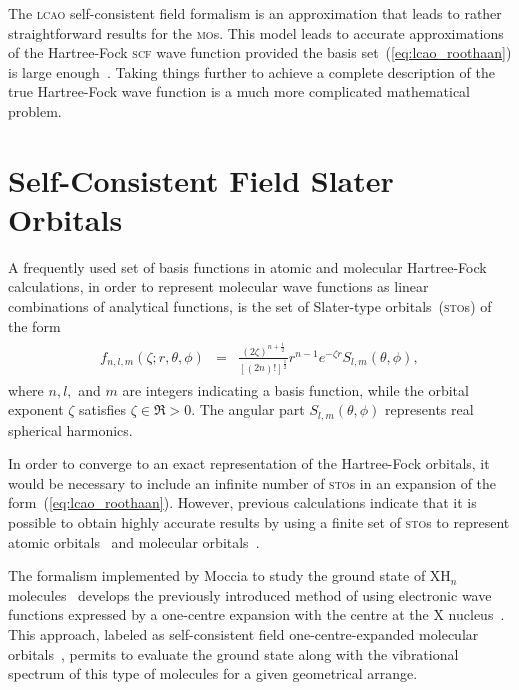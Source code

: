 The \textsc{lcao} self-consistent field formalism is an approximation
that leads to rather straightforward results for the
\textsc{mo}s. This model leads to accurate approximations of the
Hartree-Fock \textsc{scf} wave function provided the basis
set~(\ref{eq:lcao_roothaan}) is large
enough~\cite{EllisonShullh2o_1955, Moccia_JCP_2164, Moccia_JCP_2176,
  Moccia_1964}. Taking things further to achieve a complete
description of the true Hartree-Fock wave function is a much more
complicated mathematical problem.


\section{Self-Consistent Field Slater Orbitals}
\label{ch:scf_sto}

A frequently used set of basis functions in atomic and molecular
Hartree-Fock calculations, in order to represent molecular wave
functions as linear combinations of analytical functions, is the set
of Slater-type orbitals~(\textsc{sto}s) of the form
%
\begin{eqnarray}
  \begin{split}
    f_{n,l,m}(\zeta;r,\theta,\phi) & = &
    \frac{(2\zeta)^{n + \frac{1}{2}}}{[(2n)!]^{\frac{1}{2}}} r^{n-1} e^{-\zeta r}
    S_{l,m}(\theta,\phi),
  \end{split}
  \label{eq:f_STO}
\end{eqnarray}
%
where $n,l,$ and $m$ are integers indicating a basis function, while
the orbital exponent $\zeta$ satisfies $\zeta \in \Re > 0 $. The
angular part $S_{l,m}(\theta,\phi)$ represents real spherical
harmonics.

In order to converge to an exact representation of the Hartree-Fock
orbitals, it would be necessary to include an infinite number of
\textsc{sto}s in an expansion of the
form~(\ref{eq:lcao_roothaan}). However, previous calculations indicate
that it is possible to obtain highly accurate results by using a
finite set of \textsc{sto}s to represent atomic
orbitals~\cite{Clementi_scfIon_1962,Clementi_STOatoms_1974,Bunge_STOtable_1993}
and molecular
orbitals~\cite{Moccia_JCP_2164,Moccia_JCP_2176,Moccia_1964}.

The formalism implemented by Moccia to study the ground state of
XH$_{n}$ molecules~\cite{Moccia_JCP_2164,Moccia_JCP_2176,Moccia_1964}
develops the previously introduced method of using electronic wave
functions expressed by a one-centre expansion with the centre at the X
nucleus~\cite{Parr_JCP_1960,oneCentre_1961}. This approach, labeled as
self-consistent field one-centre-expanded molecular
orbitals~\cite{Moccia_JCP_2164}, permits to evaluate the ground state
along with the vibrational spectrum of this type of molecules for a
given geometrical arrange.

